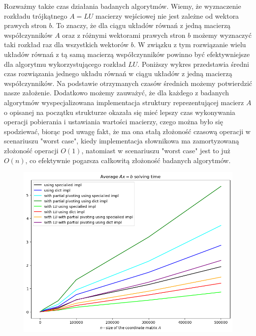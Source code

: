 \documentclass[11pt]{article}
\begin{document}
    \noindent
    Rozważmy także czas działania badanych algorytmów. Wiemy, że wyznaczenie rozkładu trójkątnego $A = LU$ macierzy wejściowej nie jest zależne od wektora prawych stron $b$. To znaczy, że dla ciągu układów równań z jedną macierzą współczynników $A$ oraz z różnymi wektorami prawych stron $b$ możemy wyznaczyć taki rozkład raz dla wszystkich wektorów $b$. W związku z tym rozwiązanie wielu układów równań z tą samą macierzą współczynników powinno być efektywniejsze dla algorytmu wykorzystującego rozkład $LU$.
    \newline\newline
    Poniższy wykres przedstawia średni czas rozwiązania jednego układu równań w ciągu układów z jedną macierzą współczynników. Na podstawie otrzymanych czasów średnich możemy potwierdzić nasze założenie.
    \newline
    Dodatkowo możemy zauważyć, że dla każdego z badanych algorytmów wyspecjalizowana implementacja struktury reprezentującej macierz $A$ o opisanej na początku strukturze okazała się mieć lepszy czas wykonywania operacji pobierania i ustawiania wartości macierzy, czego można było się spodziewać, biorąc pod uwagę fakt, że ma ona stałą złożoność czasową operacji w scenariuszu "worst case", kiedy implementacja słownikowa ma zamortyzowaną złożoność operacji $O(1)$, natomiast w scenariuszu "worst case" jest to już $O(n)$, co efektywnie pogarsza całkowitą złożoność badanych algorytmów.

    \begin{figure}[htbp]
    \centering
        \includegraphics[width=0.68\linewidth]{img/avg_time.png}
    \end{figure}
\end{document}

